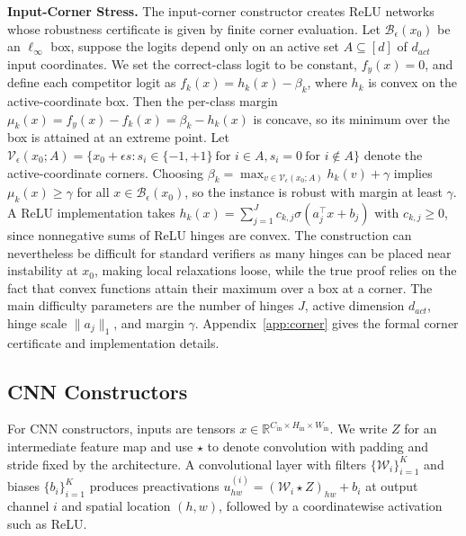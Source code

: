 \documentclass{article}
\theoremstyle{definition}
\begin{document}
\textbf{Input-Corner Stress.}
The input-corner constructor creates ReLU networks whose robustness certificate is given by finite corner evaluation. 
Let $\mathcal B_\epsilon(x_0)$ be an $\ell_\infty$ box, suppose the %
logits depend only on an active set 
$A\subseteq [d]$ 
of $d_{act}$ input coordinates. %
We set the correct-class logit to be constant, $f_y(x)=0$, and define each competitor logit as $f_k(x)=h_k(x)-\beta_k$, where $h_k$ is convex on the active-coordinate box. 
Then the per-class margin $\mu_k(x)=f_y(x)-f_k(x)=\beta_k-h_k(x)$ is concave, so its minimum over the box is attained at an extreme point. Let 
$\mathcal V_\epsilon(x_0;A)=\{x_0+\epsilon s:s_i\in\{-1,+1\}\ \text{for } i\in A, s_i=0\ \text{for } i\notin A\}$ denote the active-coordinate corners. 
Choosing $\beta_k=\max_{v\in\mathcal V_\epsilon(x_0;A)} h_k(v)+\gamma \label{eq:corner_beta}$ 
implies $\mu_k(x)\geq\gamma$ for all $x\in\mathcal B_\epsilon(x_0)$, so the instance is robust with margin at least $\gamma$. 
A ReLU implementation takes $h_k(x)=\sum_{j=1}^J c_{k,j}\sigma(a_j^\top x+b_j)$ with $c_{k,j}\geq 0$, since nonnegative sums of ReLU hinges are convex. 
The construction can nevertheless be difficult for standard verifiers as many hinges can be placed near instability at $x_0$, making local relaxations loose, while the true proof relies on the %
fact that convex functions attain their maximum over a box at a corner. 
The main difficulty parameters are the number of hinges $J$, active dimension $d_{act}$, hinge scale $\|a_j\|_1$, and margin %
$\gamma$. 
Appendix~\ref{app:corner} gives the formal corner certificate and implementation details. 

\subsection{CNN Constructors} 

For CNN constructors, inputs are tensors $x\in\mathbb R^{C_{\mathrm{in}}\times H_{\mathrm{in}}\times W_{\mathrm{in}}}$. 
We write $Z$ for an intermediate feature map and use $\star$ to denote convolution with %
padding and stride fixed by the architecture. 
A convolutional layer with filters $\{\mathcal{W}_i\}_{i=1}^K$ and biases $\{b_i\}_{i=1}^K$ produces preactivations $u_{hw}^{(i)}=(\mathcal{W}_i\star Z)_{hw}+b_i$ at output channel $i$ and spatial location $(h,w)$, followed by a %
coordinatewise activation such as ReLU. 
\end{document}
